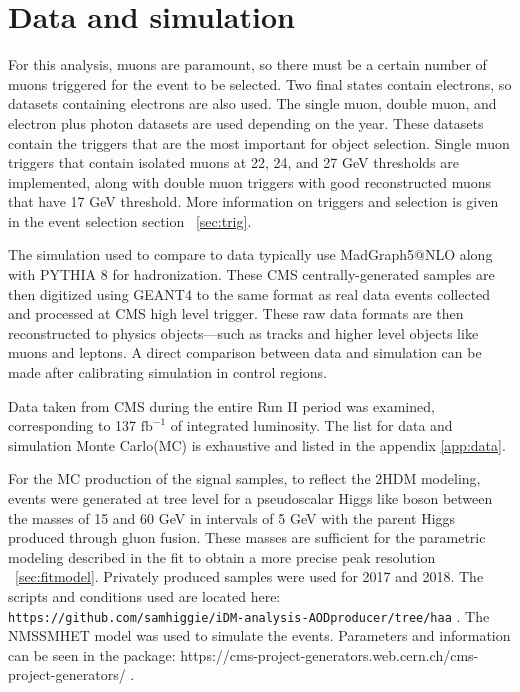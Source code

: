 


\section{Data and simulation}
For this analysis, muons are paramount, so there must be a certain number of muons triggered for the event to be selected. Two final states contain electrons, so datasets containing electrons are also used. The single muon, double muon, and electron plus photon datasets are used depending on the year. These datasets contain the triggers that are the most important for object selection. Single muon triggers that contain isolated muons at 22, 24, and 27 GeV thresholds are implemented, along with double muon triggers with good reconstructed muons that have 17 GeV threshold. More information on triggers and selection is given in the event selection section ~\ref{sec:trig}. 

The simulation used to compare to data typically use MadGraph5@NLO along with PYTHIA 8 for hadronization. These CMS centrally-generated samples are then digitized using GEANT4 to the same format as real data events collected and processed at CMS high level trigger. These raw data formats are then reconstructed to physics objects---such as tracks and higher level objects like muons and leptons. A direct comparison between data and simulation can be made after calibrating simulation in control regions. 

Data taken from CMS during the entire Run II period was examined, corresponding to 137 $\text{fb}^{-1}$ of integrated luminosity. The list for data and simulation Monte Carlo(MC) is exhaustive and listed in the appendix \ref{app:data}.   

For the MC production of the signal samples, to reflect the 2HDM modeling, events were generated at tree level for a pseudoscalar Higgs like boson between the masses of 15 and 60 GeV in intervals of 5 GeV with the parent Higgs produced through gluon fusion. These masses are sufficient for the parametric modeling described in the fit to obtain a more precise peak resolution ~\ref{sec:fitmodel}. Privately produced samples were used for 2017 and 2018. The scripts and conditions used are located here:
 \texttt{https://github.com/samhiggie/iDM-analysis-AODproducer/tree/haa} .
The NMSSMHET model was used to simulate the events. Parameters and information can be seen in the package:
https://cms-project-generators.web.cern.ch/cms-project-generators/ .



